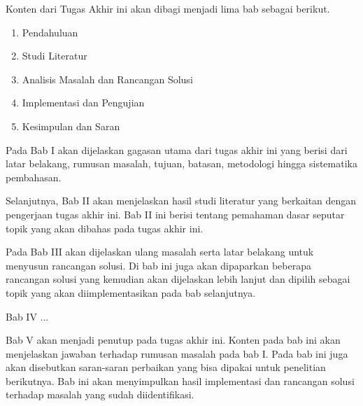 Konten dari Tugas Akhir ini akan dibagi menjadi lima bab sebagai berikut.
\begin{enumerate}
    \item Pendahuluan
    \item Studi Literatur
    \item Analisis Masalah dan Rancangan Solusi
    \item Implementasi dan Pengujian
    \item Kesimpulan dan Saran
\end{enumerate}

Pada Bab I akan dijelaskan gagasan utama dari tugas akhir ini yang berisi dari latar belakang, rumusan masalah, tujuan, batasan, metodologi hingga sistematika pembahasan.

Selanjutnya, Bab II akan menjelaskan hasil studi literatur yang berkaitan dengan pengerjaan tugas akhir ini. Bab II ini berisi tentang pemahaman dasar seputar topik yang akan dibahas pada tugas akhir ini.

Pada Bab III akan dijelaskan ulang masalah serta latar belakang untuk menyusun rancangan solusi. Di bab ini juga akan dipaparkan beberapa rancangan solusi yang kemudian akan dijelaskan lebih lanjut dan dipilih sebagai topik yang akan diimplementasikan pada bab selanjutnya.

Bab IV ...

Bab V akan menjadi penutup pada tugas akhir ini. Konten pada bab ini akan menjelaskan jawaban terhadap rumusan masalah pada bab I. Pada bab ini juga akan disebutkan saran-saran perbaikan yang bisa dipakai untuk penelitian berikutnya. Bab ini akan menyimpulkan hasil implementasi dan rancangan solusi terhadap masalah yang sudah diidentifikasi.